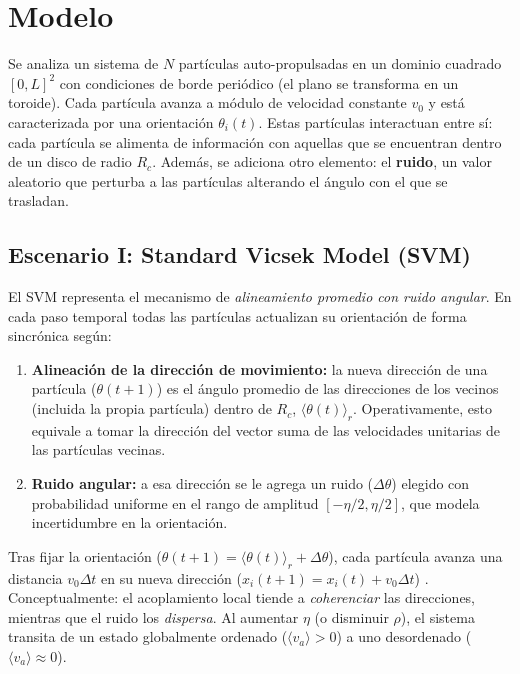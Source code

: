 \documentclass{article}
\begin{document}
\section{Modelo}

Se analiza un sistema de \(N\) partículas auto-propulsadas en un dominio cuadrado \([0,L]^2\) con condiciones de borde periódico (el plano se transforma en un toroide). Cada partícula avanza a módulo de velocidad constante \(v_0\) y está caracterizada por una orientación \(\theta_i(t)\). Estas partículas interactuan entre sí: cada partícula se alimenta de información con aquellas que se encuentran dentro de un disco de radio \(R_c\). Además, se adiciona otro elemento: el \textbf{ruido}, un valor aleatorio que perturba a las partículas alterando el ángulo con el que se trasladan. 

\subsection{Escenario I: Standard Vicsek Model (SVM) \cite{vicsek1995}}
El SVM representa el mecanismo de \emph{alineamiento promedio con ruido angular}. En cada paso temporal todas las partículas actualizan su orientación de forma sincrónica según:
\begin{enumerate}
  \item \textbf{Alineación de la dirección de movimiento:} la nueva dirección de una partícula (\(\theta(t+1)\)) es el ángulo promedio de las direcciones de los vecinos (incluida la propia partícula) dentro de \(R_c\), \(\langle\theta(t)\rangle_r\). Operativamente, esto equivale a tomar la dirección del vector suma de las velocidades unitarias de las partículas vecinas.
  \item \textbf{Ruido angular:} a esa dirección se le agrega un ruido (\(\Delta \theta\)) elegido con probabilidad uniforme en el rango de amplitud \([-\eta/2, \eta/2]\), que modela incertidumbre en la orientación.
\end{enumerate}
Tras fijar la orientación (\(\theta(t+1)= \langle\theta(t)\rangle_r + \Delta \theta\)), cada partícula avanza una distancia \(v_0\Delta t\) en su nueva dirección (\(x_i(t+1) = x_i(t) + v_0\Delta t\)) . Conceptualmente: el acoplamiento local tiende a \emph{coherenciar} las direcciones, mientras que el ruido los \emph{dispersa}. Al aumentar \(\eta\) (o disminuir \(\rho\)), el sistema transita de un estado globalmente ordenado (\(\langle v_a\rangle>0\)) a uno desordenado (\(\langle v_a\rangle\approx 0\)).
\end{document}
